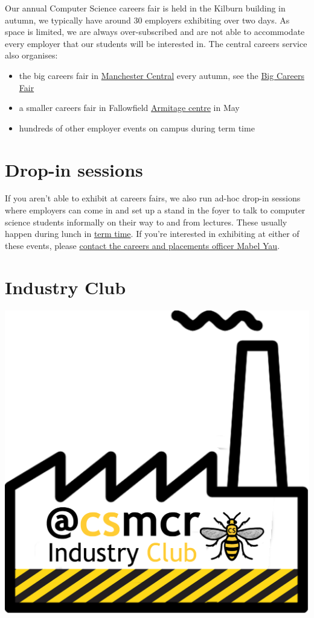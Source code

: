 \documentclass[12pt,]{book}
\providecommand{\tightlist}{%
  \setlength{\itemsep}{0pt}\setlength{\parskip}{0pt}}
\begin{document}
Our annual Computer Science careers fair is held in the Kilburn building in autumn, we typically have around 30 employers exhibiting over two days. As space is limited, we are always over-subscribed and are not able to accommodate every employer that our students will be interested in. The central careers service also organises:

\begin{itemize}
\tightlist
\item
  the big careers fair in \href{https://www.manchestercentral.co.uk/}{Manchester Central} every autumn, see the \href{http://www.careers.manchester.ac.uk/events/bigcareersfair/}{Big Careers Fair}
\item
  a smaller careers fair in Fallowfield \href{http://www.sport.manchester.ac.uk/facilities/armitage/}{Armitage centre} in May
\item
  hundreds of other employer events on campus during term time \citep{highfliers2019}
\end{itemize}

\hypertarget{drop-in-sessions}{%
\section{Drop-in sessions}\label{drop-in-sessions}}

If you aren't able to exhibit at careers fairs, we also run ad-hoc drop-in sessions where employers can come in and set up a stand in the foyer to talk to computer science students informally on their way to and from lectures. These usually happen during lunch in \href{https://www.manchester.ac.uk/discover/key-dates/}{term time}. If you're interested in exhibiting at either of these events, please \protect\hyperlink{contact}{contact the careers and placements officer Mabel Yau}.

\hypertarget{industry-club}{%
\section{Industry Club}\label{industry-club}}

\begin{center}\includegraphics[width=0.4\linewidth]{images/industry-club-black} \end{center}
\end{document}
